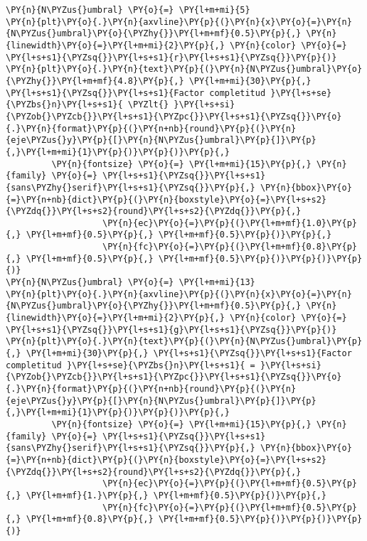 \begin{tcolorbox}[breakable, size=fbox, boxrule=1pt, pad at break*=1mm,colback=cellbackground, colframe=cellborder]
\begin{Verbatim}[commandchars=\\\{\}]
\PY{n}{N\PYZus{}umbral} \PY{o}{=} \PY{l+m+mi}{5}
\PY{n}{plt}\PY{o}{.}\PY{n}{axvline}\PY{p}{(}\PY{n}{x}\PY{o}{=}\PY{n}{N\PYZus{}umbral}\PY{o}{\PYZhy{}}\PY{l+m+mf}{0.5}\PY{p}{,} \PY{n}{linewidth}\PY{o}{=}\PY{l+m+mi}{2}\PY{p}{,} \PY{n}{color} \PY{o}{=} \PY{l+s+s1}{\PYZsq{}}\PY{l+s+s1}{r}\PY{l+s+s1}{\PYZsq{}}\PY{p}{)}
\PY{n}{plt}\PY{o}{.}\PY{n}{text}\PY{p}{(}\PY{n}{N\PYZus{}umbral}\PY{o}{\PYZhy{}}\PY{l+m+mf}{4.8}\PY{p}{,} \PY{l+m+mi}{30}\PY{p}{,} \PY{l+s+s1}{\PYZsq{}}\PY{l+s+s1}{Factor completitud }\PY{l+s+se}{\PYZbs{}n}\PY{l+s+s1}{ \PYZlt{} }\PY{l+s+si}{\PYZob{}\PYZcb{}}\PY{l+s+s1}{\PYZpc{}}\PY{l+s+s1}{\PYZsq{}}\PY{o}{.}\PY{n}{format}\PY{p}{(}\PY{n+nb}{round}\PY{p}{(}\PY{n}{eje\PYZus{}y}\PY{p}{[}\PY{n}{N\PYZus{}umbral}\PY{p}{]}\PY{p}{,}\PY{l+m+mi}{1}\PY{p}{)}\PY{p}{)}\PY{p}{,}
         \PY{n}{fontsize} \PY{o}{=} \PY{l+m+mi}{15}\PY{p}{,} \PY{n}{family} \PY{o}{=} \PY{l+s+s1}{\PYZsq{}}\PY{l+s+s1}{sans\PYZhy{}serif}\PY{l+s+s1}{\PYZsq{}}\PY{p}{,} \PY{n}{bbox}\PY{o}{=}\PY{n+nb}{dict}\PY{p}{(}\PY{n}{boxstyle}\PY{o}{=}\PY{l+s+s2}{\PYZdq{}}\PY{l+s+s2}{round}\PY{l+s+s2}{\PYZdq{}}\PY{p}{,}
                   \PY{n}{ec}\PY{o}{=}\PY{p}{(}\PY{l+m+mf}{1.0}\PY{p}{,} \PY{l+m+mf}{0.5}\PY{p}{,} \PY{l+m+mf}{0.5}\PY{p}{)}\PY{p}{,}
                   \PY{n}{fc}\PY{o}{=}\PY{p}{(}\PY{l+m+mf}{0.8}\PY{p}{,} \PY{l+m+mf}{0.5}\PY{p}{,} \PY{l+m+mf}{0.5}\PY{p}{)}\PY{p}{)}\PY{p}{)}
\PY{n}{N\PYZus{}umbral} \PY{o}{=} \PY{l+m+mi}{13}
\PY{n}{plt}\PY{o}{.}\PY{n}{axvline}\PY{p}{(}\PY{n}{x}\PY{o}{=}\PY{n}{N\PYZus{}umbral}\PY{o}{\PYZhy{}}\PY{l+m+mf}{0.5}\PY{p}{,} \PY{n}{linewidth}\PY{o}{=}\PY{l+m+mi}{2}\PY{p}{,} \PY{n}{color} \PY{o}{=} \PY{l+s+s1}{\PYZsq{}}\PY{l+s+s1}{g}\PY{l+s+s1}{\PYZsq{}}\PY{p}{)}
\PY{n}{plt}\PY{o}{.}\PY{n}{text}\PY{p}{(}\PY{n}{N\PYZus{}umbral}\PY{p}{,} \PY{l+m+mi}{30}\PY{p}{,} \PY{l+s+s1}{\PYZsq{}}\PY{l+s+s1}{Factor completitud }\PY{l+s+se}{\PYZbs{}n}\PY{l+s+s1}{ = }\PY{l+s+si}{\PYZob{}\PYZcb{}}\PY{l+s+s1}{\PYZpc{}}\PY{l+s+s1}{\PYZsq{}}\PY{o}{.}\PY{n}{format}\PY{p}{(}\PY{n+nb}{round}\PY{p}{(}\PY{n}{eje\PYZus{}y}\PY{p}{[}\PY{n}{N\PYZus{}umbral}\PY{p}{]}\PY{p}{,}\PY{l+m+mi}{1}\PY{p}{)}\PY{p}{)}\PY{p}{,}
         \PY{n}{fontsize} \PY{o}{=} \PY{l+m+mi}{15}\PY{p}{,} \PY{n}{family} \PY{o}{=} \PY{l+s+s1}{\PYZsq{}}\PY{l+s+s1}{sans\PYZhy{}serif}\PY{l+s+s1}{\PYZsq{}}\PY{p}{,} \PY{n}{bbox}\PY{o}{=}\PY{n+nb}{dict}\PY{p}{(}\PY{n}{boxstyle}\PY{o}{=}\PY{l+s+s2}{\PYZdq{}}\PY{l+s+s2}{round}\PY{l+s+s2}{\PYZdq{}}\PY{p}{,}
                   \PY{n}{ec}\PY{o}{=}\PY{p}{(}\PY{l+m+mf}{0.5}\PY{p}{,} \PY{l+m+mf}{1.}\PY{p}{,} \PY{l+m+mf}{0.5}\PY{p}{)}\PY{p}{,}
                   \PY{n}{fc}\PY{o}{=}\PY{p}{(}\PY{l+m+mf}{0.5}\PY{p}{,} \PY{l+m+mf}{0.8}\PY{p}{,} \PY{l+m+mf}{0.5}\PY{p}{)}\PY{p}{)}\PY{p}{)}


\end{Verbatim}
\end{tcolorbox}
